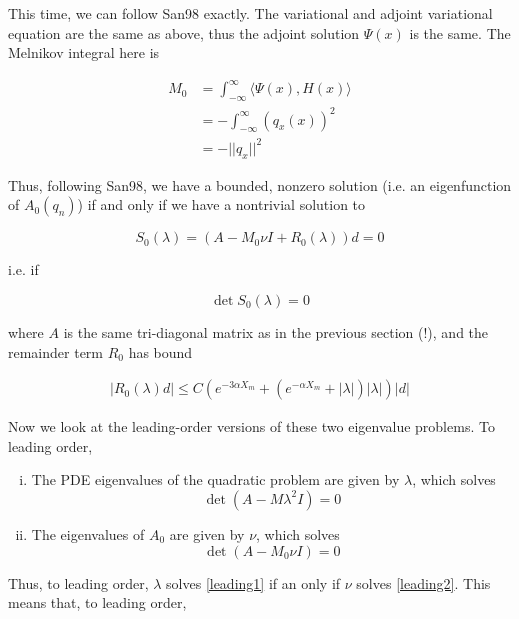 \documentclass[12pt]{article}
\begin{document}
This time, we can follow San98 exactly. The variational and adjoint variational equation are the same as above, thus the adjoint solution $\Psi(x)$ is the same. The Melnikov integral here is

\begin{align*}
M_0 &= \int_{-\infty}^\infty \langle \Psi(x), H(x) \rangle \\
&= -\int_{-\infty}^\infty (q_x(x))^2 \\
&= -||q_x||^2
\end{align*}

Thus, following San98, we have a bounded, nonzero solution (i.e. an eigenfunction of $A_0(q_n)$) if and only if we have a nontrivial solution to 

\begin{equation}
S_0(\lambda) = (A - M_0 \nu I + R_0(\lambda))d = 0
\end{equation}

i.e. if 

\begin{equation}
\det S_0(\lambda) = 0
\end{equation}


where $A$ is the same tri-diagonal matrix as in the previous section (!), and the remainder term $R_0$ has bound

\begin{align}
|R_0(\lambda)d| \leq C( e^{-3 \alpha X_m} + ( e^{-\alpha X_m} + |\lambda|)|\lambda| )|d|
\end{align}

Now we look at the leading-order versions of these two eigenvalue problems. To leading order,

\begin{enumerate}[(i)]
\item The PDE eigenvalues of the quadratic problem are given by $\lambda$, which solves
\begin{equation}\label{leading1}
\det(A - M \lambda^2 I ) = 0
\end{equation}
\item The eigenvalues of $A_0$ are given by $\nu$, which solves
\begin{equation}\label{leading2}
\det(A - M_0 \nu I ) = 0
\end{equation}
\end{enumerate}

Thus, to leading order, $\lambda$ solves \eqref{leading1} if an only if $\nu$ solves \eqref{leading2}. This means that, to leading order,
\end{document}
